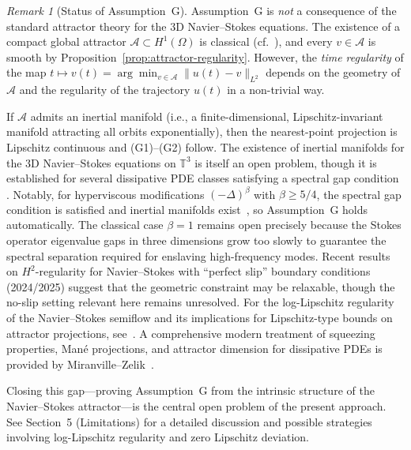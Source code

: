 \documentclass[12pt,a4paper]{article}
\theoremstyle{definition}
\theoremstyle{plain}
\theoremstyle{remark}
\newtheorem{remark}[definition]{Remark}
\begin{document}
\begin{remark}[Status of Assumption~G]\label{rem:assumption-G}
Assumption~G is \emph{not} a consequence of the standard attractor theory for the
3D Navier--Stokes equations.  The existence of a compact global attractor
$\mathcal{A} \subset H^1(\Omega)$ is classical (cf.\
\cite{FoiasManleyRosaTemam2001,Temam2001}), and every $v \in \mathcal{A}$ is smooth
by Proposition~\ref{prop:attractor-regularity}.  However, the \emph{time regularity}
of the map $t \mapsto v(t) = \arg\min_{v \in \mathcal{A}} \|u(t) - v\|_{L^2}$
depends on the geometry of $\mathcal{A}$ and the regularity of the trajectory $u(t)$
in a non-trivial way.

If $\mathcal{A}$ admits an inertial manifold (i.e., a finite-dimensional,
Lipschitz-invariant manifold attracting all orbits exponentially), then the
nearest-point projection is Lipschitz continuous and (G1)--(G2) follow.
The existence of inertial manifolds for the 3D Navier--Stokes equations on
$\mathbb{T}^3$ is itself an open problem, though it is established for several
dissipative PDE classes satisfying a spectral gap condition
\cite{EdenFoiasNicolaenko1994}. Notably, for hyperviscous
modifications $(-\Delta)^{\beta}$ with $\beta \geq 5/4$, the spectral gap
condition is satisfied and inertial manifolds exist~\cite{MalletParetSell1988},
so Assumption~G holds automatically. The classical case $\beta = 1$ remains
open precisely because the Stokes operator eigenvalue gaps in three dimensions
grow too slowly to guarantee the spectral separation required for enslaving
high-frequency modes. Recent results on $H^2$-regularity for Navier--Stokes
with ``perfect slip'' boundary conditions (2024/2025) suggest that the
geometric constraint may be relaxable, though the no-slip setting relevant
here remains unresolved.
For the log-Lipschitz regularity of the Navier--Stokes semiflow and its
implications for Lipschitz-type bounds on attractor projections,
see~\cite{BaeCannone2016,MalletParetSell1988}.
A comprehensive modern treatment of squeezing properties, Man\'e projections,
and attractor dimension for dissipative PDEs is provided
by Miranville--Zelik~\cite{MiranvilleZelik2008}.

Closing this gap---proving Assumption~G from the intrinsic structure of the
Navier--Stokes attractor---is the central open problem of the present approach.
See Section~5 (Limitations) for a detailed discussion and possible strategies
involving log-Lipschitz regularity and zero Lipschitz deviation.


\end{remark}
\end{document}

